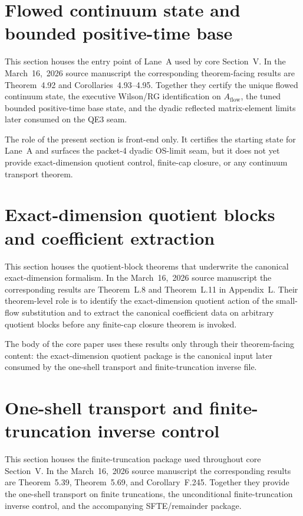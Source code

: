\documentclass[preprint,aip,jmp,amsmath,amssymb,nofootinbib]{revtex4-2}
\begin{document}
\section{Flowed continuum state and bounded positive-time base}
This section houses the entry point of Lane~A used by core Section~V. In the March~16,~2026 source manuscript the corresponding theorem-facing results are Theorem~4.92 and Corollaries~4.93--4.95. Together they certify the unique flowed continuum state, the executive Wilson/RG identification on $A_{\mathrm{flow}}$, the tuned bounded positive-time base state, and the dyadic reflected matrix-element limits later consumed on the QE3 seam.


The role of the present section is front-end only. It certifies the starting state for Lane~A and surfaces the packet-4 dyadic OS-limit seam, but it does not yet provide exact-dimension quotient control, finite-cap closure, or any continuum transport theorem.

\section{Exact-dimension quotient blocks and coefficient extraction}
This section houses the quotient-block theorems that underwrite the canonical exact-dimension formalism. In the March~16,~2026 source manuscript the corresponding results are Theorem~L.8 and Theorem~L.11 in Appendix~L. Their theorem-level role is to identify the exact-dimension quotient action of the small-flow substitution and to extract the canonical coefficient data on arbitrary quotient blocks before any finite-cap closure theorem is invoked.


The body of the core paper uses these results only through their theorem-facing content: the exact-dimension quotient package is the canonical input later consumed by the one-shell transport and finite-truncation inverse file.

\section{One-shell transport and finite-truncation inverse control}
This section houses the finite-truncation package used throughout core Section~V. In the March~16,~2026 source manuscript the corresponding results are Theorem~5.39, Theorem~5.69, and Corollary~F.245. Together they provide the one-shell transport on finite truncations, the unconditional finite-truncation inverse control, and the accompanying SFTE/remainder package.
\end{document}
